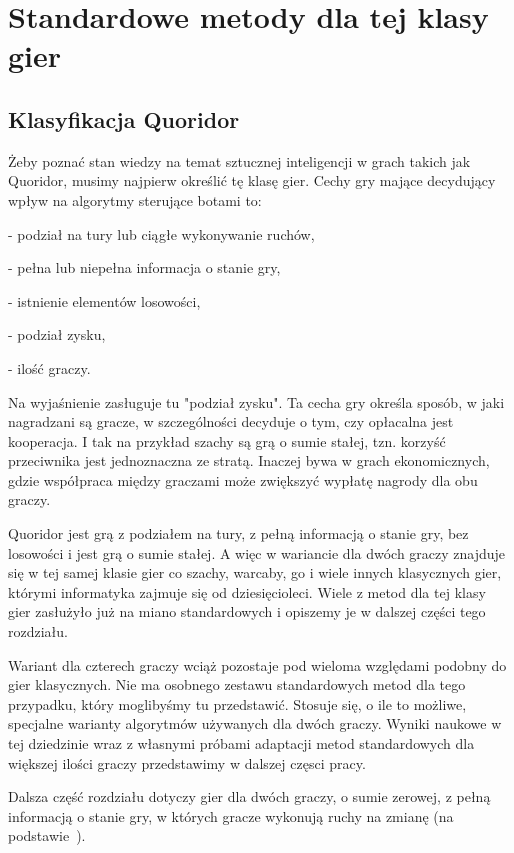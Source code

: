 \documentclass{pracamgr}
\begin{document}
\chapter{Standardowe metody dla tej klasy gier}

\section{Klasyfikacja Quoridor}

Żeby poznać stan wiedzy na temat sztucznej inteligencji w grach takich jak Quoridor, musimy najpierw określić tę klasę gier.
Cechy gry mające decydujący wpływ na algorytmy sterujące botami to:

 - podział na tury lub ciągłe wykonywanie ruchów,

 - pełna lub niepełna informacja o stanie gry,

 - istnienie elementów losowości,

 - podział zysku,

 - ilość graczy.

Na wyjaśnienie zasługuje tu "podział zysku". Ta cecha gry określa sposób, w jaki nagradzani są gracze, w szczególności decyduje o tym, czy opłacalna jest kooperacja. I tak na przykład szachy są grą o sumie stałej, tzn. korzyść przeciwnika jest jednoznaczna ze stratą. Inaczej bywa w grach ekonomicznych, gdzie współpraca między graczami może zwiększyć wypłatę nagrody dla obu graczy.

Quoridor jest grą z podziałem na tury, z pełną informacją o stanie gry, bez losowości i jest grą o sumie stałej. A więc w wariancie dla dwóch graczy znajduje się w tej samej klasie gier co szachy, warcaby, go i wiele innych klasycznych gier, którymi informatyka zajmuje się od dziesięcioleci. Wiele z metod dla tej klasy gier zasłużyło już na miano standardowych i opiszemy je w dalszej części tego rozdziału.

Wariant dla czterech graczy wciąż pozostaje pod wieloma względami podobny do gier klasycznych. Nie ma osobnego zestawu standardowych metod dla tego przypadku, który moglibyśmy tu przedstawić. Stosuje się, o ile to możliwe, specjalne warianty algorytmów używanych dla dwóch graczy. Wyniki naukowe w tej dziedzinie wraz z własnymi próbami adaptacji metod standardowych dla większej ilości graczy przedstawimy w dalszej częsci pracy.

Dalsza część rozdziału dotyczy gier dla dwóch graczy, o sumie zerowej, z pełną informacją o stanie gry, w których gracze wykonują ruchy na zmianę (na podstawie~\cite{pawlewicz}).
\end{document}
